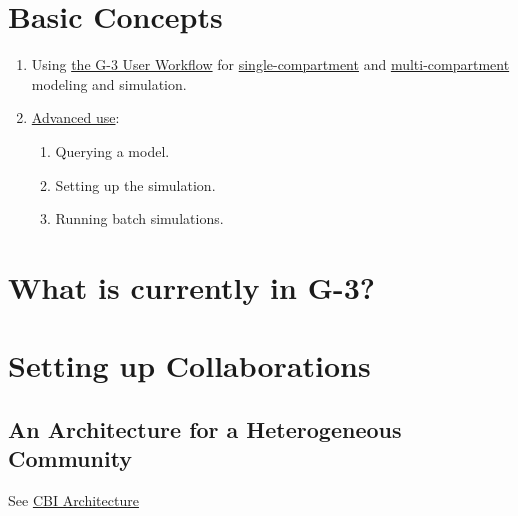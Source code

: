 \documentclass[12pt]{article}
\begin{document}
\section{Basic Concepts}

\begin{enumerate}
\item Using \href{../workflow-user/workflow-user.tex}{the G-3 User
    Workflow} for
  \href{../tutorial1/tutorial1.tex}{single-compartment} and
  \href{../tutorial2/tutorial2.tex}{multi-compartment} modeling and
  simulation.
\item \href{../tutorial3/tutorial3.tex}{Advanced use}:
  \begin{enumerate}
  \item Querying a model.
  \item Setting up the simulation.
  \item Running batch simulations.
  \end{enumerate}
\end{enumerate}

\section{What is currently in G-3?}


\section{Setting up Collaborations}

\subsection{An Architecture for a Heterogeneous Community}

See \href{../genesis-overview/genesis-overview.tex}{CBI Architecture}
\end{document}
